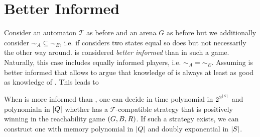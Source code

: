 \section{Better Informed \adam{}}
Consider an automaton $\mathcal{T}$ as before and an arena $G$ as before but we
additionally consider $\sim_{A} \subseteq \sim_{E}$, i.e. if \adam{} considers
two states equal so does \eve{} but not necessarily the other way around. 
\adam{} is considered \emph{better informed} than \eve{} in such a game. 
Naturally, this case includes equally informed players, i.e. 
$\sim_{A} = \sim_{E}$. Assuming \adam{} is better informed that \eve{} allows
to argue that knowledge of \adam{} is always at least as good as knowledge of
\eve{}. This leads to
\begin{theorem}
  When \adam{} is more informed than \eve{}, one can decide in time polynomial
  in $2^{2^{\left\vert{S}\right\vert}}$ and polynomialn in $\left\vert{Q}\right\vert$ whether \eve{} has a 
  $\mathcal{T}$-compatible strategy that is positively winning in the 
  reachability game $\left(G, B, R\right)$. If such a strategy exists, we can 
  construct one with memory polynomial in $\left\vert{Q}\right\vert$ and doubly exponential in
  $\left\vert{S}\right\vert$.
\end{theorem}
